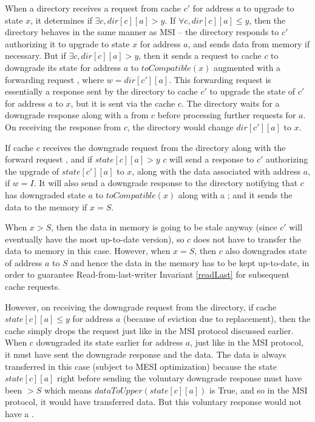 When a directory receives a request from cache $c'$ for address $a$ to upgrade
to state $x$, it determines if $\exists c, dir[c][a] > y$. If $\forall c,
dir[c][a] \le y$, then the directory behaves in the same manner as MSI -- the
directory responds to $c'$ authorizing it to upgrade to state $x$ for address
$a$, and sends data from memory if necessary. But if $\exists c, dir[c][a] > y$,
then it sends a request to cache $c$ to downgrade its state for address $a$ to
$toCompatible(x)$ augmented with a forwarding request , where
$w = dir[c'][a]$. This forwarding request is essentially a response sent by the
directory to cache $c'$ to upgrade the state of $c'$ for address $a$ to $x$, but
it is sent via the cache $c$. The directory waits for a downgrade response along
with a \FwdAck{} from $c$ before processing further requests for $a$. On
receiving the response from $c$, the directory would change $dir[c'][a]$ to $x$.

If cache $c$ receives the downgrade request from the directory along with the
forward request , and if $state[c][a] > y$ $c$ will send a
response to $c'$ authorizing the upgrade of $state[c'][a]$ to $x$, along with
the data associated with address $a$, if $w = I$. It will also send a downgrade
response to the directory notifying that $c$ has downgraded state $a$ to
$toCompatible(x)$ along with a \FwdAck{}; and it sends the data to the memory if
$x = S$.

When $x > S$, then the data in memory is going to be stale anyway (since
$c'$ will eventually have the most up-to-date version), so $c$ does not have to
transfer the data to memory in this case. However, when $x = S$, then $c$ also
downgrades state of address $a$ to $S$ and hence the data in the memory has to
be kept up-to-date, in order to guarantee Read-from-last-writer Invariant
\ref{readLast} for subsequent cache requests.

However, on receiving the downgrade request from the directory, if cache
$state[c][a] \le y$ for address $a$ (because of eviction due to replacement),
then the cache simply drops the request just like in the MSI protocol discussed
earlier. When $c$ downgraded its state earlier for address $a$, just like in the
MSI protocol, it must have sent the downgrade response and the data. The data is
always transferred in this case (subject to MESI optimization) because
the state $state[c][a]$ right before sending the voluntary downgrade
response must have been $> S$ which means $dataToUpper(state[c][a])$ is True,
and so in the MSI protocol, it would have transferred data. But this
voluntary response would not have a \FwdAck{}.


